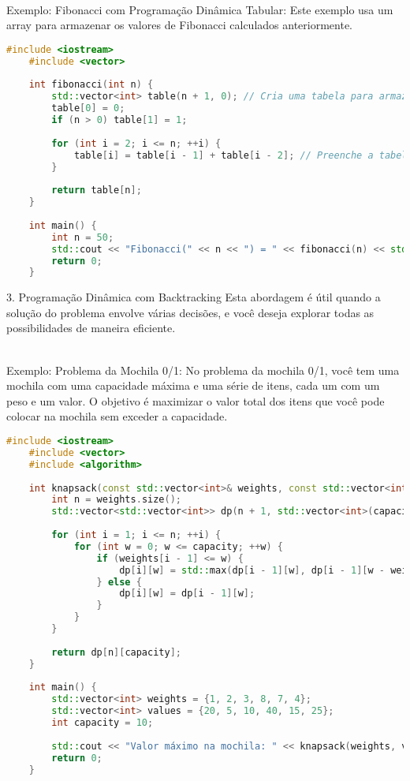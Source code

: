 \documentclass{article}
\begin{document}
\\Exemplo: Fibonacci com Programação Dinâmica Tabular: Este exemplo usa um array para armazenar os valores de Fibonacci calculados anteriormente.
\begin{lstlisting}[language=C++, caption=Fibonacci com Memoização]
    #include <iostream>
    #include <vector>
    
    int fibonacci(int n) {
        std::vector<int> table(n + 1, 0); // Cria uma tabela para armazenar os resultados
        table[0] = 0;
        if (n > 0) table[1] = 1;
    
        for (int i = 2; i <= n; ++i) {
            table[i] = table[i - 1] + table[i - 2]; // Preenche a tabela
        }
    
        return table[n];
    }
    
    int main() {
        int n = 50;
        std::cout << "Fibonacci(" << n << ") = " << fibonacci(n) << std::endl;
        return 0;
    }
\end{lstlisting}

3. Programação Dinâmica com Backtracking
Esta abordagem é útil quando a solução do problema envolve várias decisões, e você deseja explorar todas as possibilidades de maneira eficiente.

\\Exemplo: Problema da Mochila 0/1: No problema da mochila 0/1, você tem uma mochila com uma capacidade máxima e uma série de itens, cada um com um peso e um valor. O objetivo é maximizar o valor total dos itens que você pode colocar na mochila sem exceder a capacidade.

\begin{lstlisting}[language=C++, caption=Fibonacci com Memoização]
    #include <iostream>
    #include <vector>
    #include <algorithm>
    
    int knapsack(const std::vector<int>& weights, const std::vector<int>& values, int capacity) {
        int n = weights.size();
        std::vector<std::vector<int>> dp(n + 1, std::vector<int>(capacity + 1, 0));
    
        for (int i = 1; i <= n; ++i) {
            for (int w = 0; w <= capacity; ++w) {
                if (weights[i - 1] <= w) {
                    dp[i][w] = std::max(dp[i - 1][w], dp[i - 1][w - weights[i - 1]] + values[i - 1]);
                } else {
                    dp[i][w] = dp[i - 1][w];
                }
            }
        }
    
        return dp[n][capacity];
    }
    
    int main() {
        std::vector<int> weights = {1, 2, 3, 8, 7, 4};
        std::vector<int> values = {20, 5, 10, 40, 15, 25};
        int capacity = 10;
    
        std::cout << "Valor máximo na mochila: " << knapsack(weights, values, capacity) << std::endl;
        return 0;
    }
\end{lstlisting}
\end{document}
